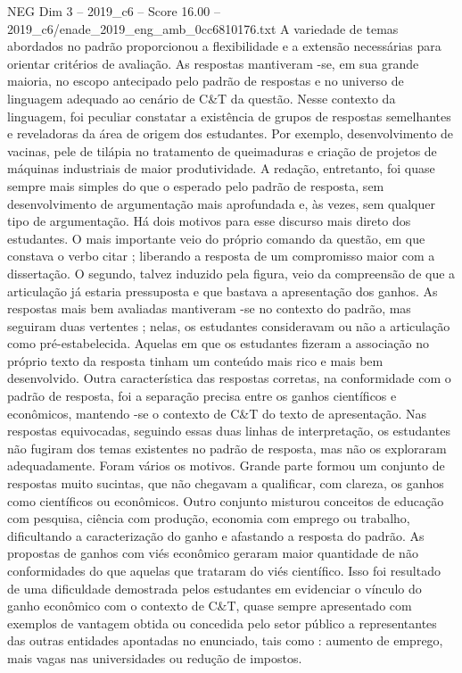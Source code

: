 \begin{textsample}{NEG Dim 3 – 2019\_c6 – Score 16.00 – 2019\_c6/enade\_2019\_eng\_amb\_0cc6810176.txt}
A variedade de temas abordados no padrão proporcionou a flexibilidade e a extensão necessárias para orientar critérios de avaliação.
As respostas mantiveram -se, em sua grande maioria, no escopo antecipado pelo padrão de respostas e no universo de linguagem adequado ao cenário de C\&T da questão.
Nesse contexto da linguagem, foi peculiar constatar a existência de grupos de respostas semelhantes e reveladoras da área de origem dos estudantes.
Por exemplo, desenvolvimento de vacinas, pele de tilápia no tratamento de queimaduras e criação de projetos de máquinas industriais de maior produtividade.
A redação, entretanto, foi quase sempre mais simples do que o esperado pelo padrão de resposta, sem desenvolvimento de argumentação mais aprofundada e, às vezes, sem qualquer tipo de argumentação.
Há dois motivos para esse discurso mais direto dos estudantes.
O mais importante veio do próprio comando da questão, em que constava o verbo citar ; liberando a resposta de um compromisso maior com a dissertação.
O segundo, talvez induzido pela figura, veio da compreensão de que a articulação já estaria pressuposta e que bastava a apresentação dos ganhos.
As respostas mais bem avaliadas mantiveram -se no contexto do padrão, mas seguiram duas vertentes ; nelas, os estudantes consideravam ou não a articulação como pré-estabelecida.
Aquelas em que os estudantes fizeram a associação no próprio texto da resposta tinham um conteúdo mais rico e mais bem desenvolvido.
Outra característica das respostas corretas, na conformidade com o padrão de resposta, foi a separação precisa entre os ganhos científicos e econômicos, mantendo -se o contexto de C\&T do texto de apresentação.
Nas respostas equivocadas, seguindo essas duas linhas de interpretação, os estudantes não fugiram dos temas existentes no padrão de resposta, mas não os exploraram adequadamente.
Foram vários os motivos.
Grande parte formou um conjunto de respostas muito sucintas, que não chegavam a qualificar, com clareza, os ganhos como científicos ou econômicos.
Outro conjunto misturou conceitos de educação com pesquisa, ciência com produção, economia com emprego ou trabalho, dificultando a caracterização do ganho e afastando a resposta do padrão.
As propostas de ganhos com viés econômico geraram maior quantidade de não conformidades do que aquelas que trataram do viés científico.
Isso foi resultado de uma dificuldade demostrada pelos estudantes em evidenciar o vínculo do ganho econômico com o contexto de C\&T, quase sempre apresentado com exemplos de vantagem obtida ou concedida pelo setor público a representantes das outras entidades apontadas no enunciado, tais como : aumento de emprego, mais vagas nas universidades ou redução de impostos.

\end{textsample}
